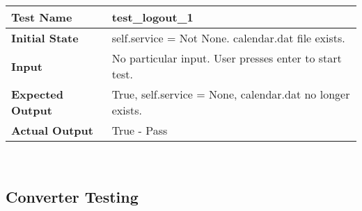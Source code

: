 \documentclass[12pt, titlepage]{article}
\begin{document}
		\begin{table}[!htbp]            
			\begin{tabularx}{\textwidth}{|l|X|}%
				\hline
                \textbf{Test Name} & test\_logout\_1
                \\\hline
                \textbf{Initial State} & self.service = Not None. calendar.dat file exists.
                \\\hline
                \textbf{Input} & No particular input. User presses enter to start test.
                \\\hline 
                \textbf{Expected Output} & True, self.service = None, calendar.dat no longer exists.
                \\\hline
                \textbf{Actual Output} & True - Pass
                \\\hline
			\end{tabularx}\\ %
    	\end{table}	
    \FloatBarrier       %
	\subsection{Converter Testing}
\end{document}
